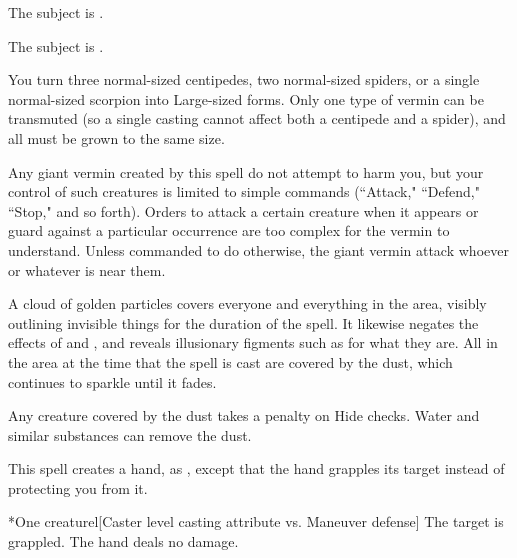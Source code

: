 \begin{spellhealthy}
    The subject is \sickened.
\end{spellhealthy}
\begin{spellblood}
    The subject is \nauseated.
\end{spellblood}

\spelldur{\durmed}
\spelleffect You turn three normal-sized centipedes, two normal-sized spiders, or a single normal-sized scorpion into Large-sized forms. Only one type of vermin can be transmuted (so a single casting cannot affect both a centipede and a spider), and all must be grown to the same size.
\par Any giant vermin created by this spell do not attempt to harm you, but your control of such creatures is limited to simple commands (``Attack," ``Defend," ``Stop," and so forth). Orders to attack a certain creature when it appears or guard against a particular occurrence are too complex for the vermin to understand. Unless commanded to do otherwise, the giant vermin attack whoever or whatever is near them.

\spelldur{\durshort}
\spelleffect A cloud of golden particles covers everyone and everything in the area, visibly outlining invisible things for the duration of the spell. It likewise negates the effects of  and , and reveals illusionary figments such as  for what they are. All in the area at the time that the spell is cast are covered by the dust, which continues to sparkle until it fades.
\par Any creature covered by the dust takes a  penalty on Hide checks.
\spelleffect Water and similar substances can remove the dust.

\spellrng{\rngmed}
\spelldur{\durshort \dismissable}
\spellline
\spelleffect This spell creates a hand, as , except that the hand grapples its target instead of protecting you from it.
\begin{spelltarget}*{One creature}l[Caster level \add casting attribute vs. Maneuver defense]
    \spellsuccess The target is grappled. The hand deals no damage.
\end{spelltarget}

